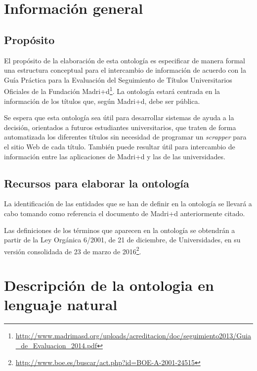 
\sloppy %

\chapter{Información general}

\section{Propósito}

El propósito de la elaboración de esta ontología es especificar de manera
formal una estructura conceptual para el intercambio de información de acuerdo
con la Guía Práctica para la Evaluación del Seguimiento de Títulos
Universitarios Oficiales de la Fundación Madri+d\footnote{\url{http://www.madrimasd.org/uploads/acreditacion/doc/seguimiento2013/Guia\_de\_Evaluacion\_2014.pdf}}. La ontología estará centrada en la información de los títulos que, según Madri+d, debe ser pública.

Se espera que esta ontología sea útil para desarrollar sistemas de ayuda a la
decisión, orientados a futuros estudiantes universitarios, que traten de forma
automatizada los diferentes títulos sin necesidad de programar un
\emph{scrapper} para el sitio Web de cada título. También puede resultar útil
para intercambio de información entre las aplicaciones de Madri+d y las de las
universidades.

\section{Recursos para elaborar la ontología}

La identificación de las entidades que se han de definir en la ontología se llevará a cabo tomando como referencia el documento de Madri+d anteriormente citado.

Las definiciones de los términos que aparecen en la ontología se obtendrán a partir de la Ley Orgánica 6/2001, de 21 de diciembre, de Universidades, en su versión consolidada de 23 de marzo de 2016\footnote{\url{http://www.boe.es/buscar/act.php?id=BOE-A-2001-24515}}.

\chapter{Descripción de la ontologia en lenguaje natural}

